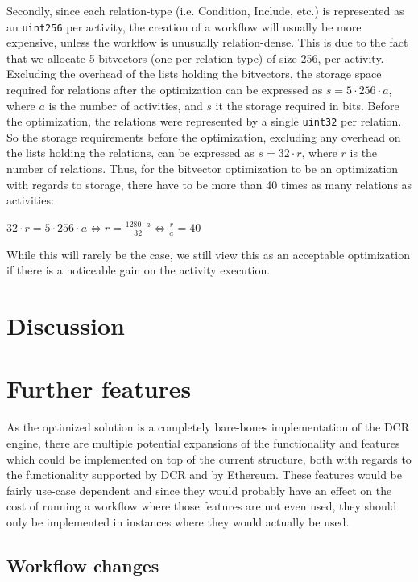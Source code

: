 \documentclass{article}
\begin{document}
		Secondly, since each relation-type (i.e. Condition, Include, etc.) is represented as an \texttt{uint256} per activity, the creation of a workflow will usually be more expensive, unless the workflow is unusually relation-dense. 
		This is due to the fact that we allocate 5 bitvectors (one per relation type) of size 256, per activity. 
		Excluding the overhead of the lists holding the bitvectors, the storage space required for relations after the optimization can be expressed as $s = 5 \cdot 256 \cdot a$, where $a$ is the number of activities, and $s$ it the storage required in bits.
		Before the optimization, the relations were represented by a single \texttt{uint32} per relation.
		So the storage requirements before the optimization, excluding any overhead on the lists holding the relations, can be expressed as $s = 32 \cdot r$, where $r$ is the number of relations.
		Thus, for the bitvector optimization to be an optimization with regards to storage, there have to be more than 40 times as many relations as activities:

		\begin{center}		
			$32 \cdot r = 5 \cdot 256 \cdot a \iff r = \frac{1280 \cdot a}{32} \iff \frac{r}{a} = 40$
		\end{center}
		
		While this will rarely be the case, we still view this as an acceptable optimization if there is a noticeable gain on the activity execution.



	\section{Discussion}

	\section{Further features}
		As the optimized solution is a completely bare-bones implementation of the DCR engine, there are multiple potential expansions of the functionality and features which could be implemented on top of the current structure, both with regards to the functionality supported by DCR and by Ethereum.
		These features would be fairly use-case dependent and since they would probably have an effect on the cost of running a workflow where those features are not even used, they should only be implemented in instances where they would actually be used.

		\subsection{Workflow changes}
		\label{sec:workflow-changes}
\end{document}
